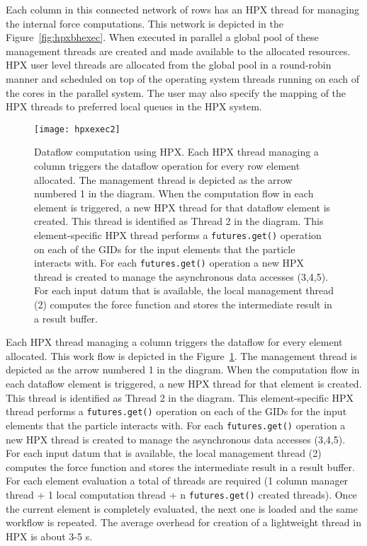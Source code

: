 \documentclass[floatfix]{revtex4}
\begin{document}
Each column in this connected network of rows has an HPX thread for managing the internal
force computations. This network is depicted in the Figure~\ref{fig:hpxbhexec}. When executed in parallel
a global pool of these management threads are created and made available to the allocated resources. 
HPX user level threads are allocated from the global pool in a round-robin
manner and scheduled on top of the operating system threads running on
each of the cores in the parallel system.
The user may also specify the mapping of the HPX threads to preferred local queues in the HPX system.

\begin{figure}[htp]
\centering
\texttt{[image: hpxexec2]}
\caption{Dataflow computation using HPX. Each HPX thread managing a column triggers the dataflow operation for
every row element allocated. The management thread is
depicted as the arrow numbered 1 in the diagram. When the
computation flow in each element is triggered, a new
HPX thread for that dataflow element is created. This thread is identified
as Thread 2 in the diagram. This element-specific HPX thread
performs a {\tt futures.get()} operation
on each of the GIDs for the input elements that the particle
interacts with. For each {\tt futures.get()} operation a new
HPX thread is created to manage the asynchronous data accesses (3,4,5).
For each input datum that is available, the local
management thread (2) computes the force function and stores the intermediate
result in a result buffer.}
\label{fig:hpxbhexec2}
\end{figure}

Each HPX thread managing a column triggers the dataflow for
every element allocated. This work flow is depicted
in the Figure~\ref{fig:hpxbhexec2}. The management thread is
depicted as the arrow numbered 1 in the diagram. When the
computation flow in each dataflow element is triggered, a new
HPX thread for that element is created. This thread is identified
as Thread 2 in the diagram. This element-specific HPX thread
performs a {\tt futures.get()} operation
on each of the GIDs for the input elements that the particle
interacts with. For each {\tt futures.get()} operation a new
HPX thread is created to manage the asynchronous data accesses (3,4,5).
For each input datum that is available, the local
management thread (2) computes the force function and stores the intermediate
result in a result buffer. For each element evaluation a total of  threads
are required (1 column manager thread + 1 local computation thread + n {\tt futures.get()}
created threads). Once the current element is completely evaluated, the next 
one is loaded and the same workflow is repeated.
The average overhead for creation of a lightweight thread in HPX is about 3-5 s.
\end{document}

